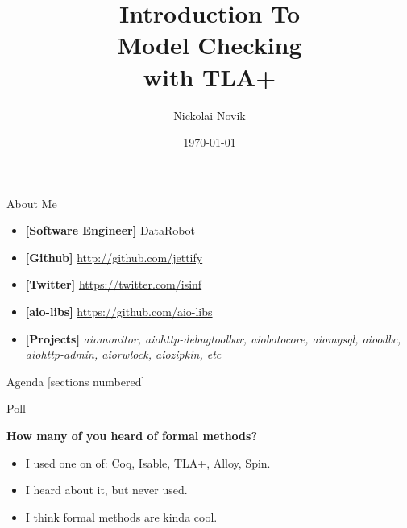 \documentclass[12pt]{beamer}
\title{Introduction To \\ Model Checking \\ with TLA+}
\date{\today}
\author{Nickolai Novik}
\institute{\href{http://github.com/jettify}{http://github.com/jettify}}
\begin{document}
  \maketitle
  \begin{frame}{About Me}
    \begin{itemize}
        \item \textbf{[Software Engineer]}  DataRobot
        \item \textbf{[Github]}
            \href{http://github.com/jettify}{http://github.com/jettify}
        \item \textbf{[Twitter]}
            \href{https://twitter.com/isinf}{https://twitter.com/isinf}
        \item \textbf{[aio-libs]}
            \href{https://github.com/aio-libs}{https://github.com/aio-libs}
        \item \textbf{[Projects]}
            \textit{aiomonitor, aiohttp-debugtoolbar,
          aiobotocore, aiomysql, aioodbc, aiohttp-admin, aiorwlock,
          aiozipkin, etc}
    \end{itemize}
  \end{frame}
  \begin{frame}[squeeze]{Agenda}
      [sections numbered]
      \tableofcontents
  \end{frame}
  \begin{frame}{Poll}
      \begin{large}
          \textbf{How many of you heard of formal methods?}
      \end{large}
      \begin{itemize}
          \item I used one on of: Coq, Isable, TLA+, Alloy, Spin.
          \item I heard about it, but never used.
          \item I think formal methods are kinda cool.
      \end{itemize}
  \end{frame}
\end{document}
